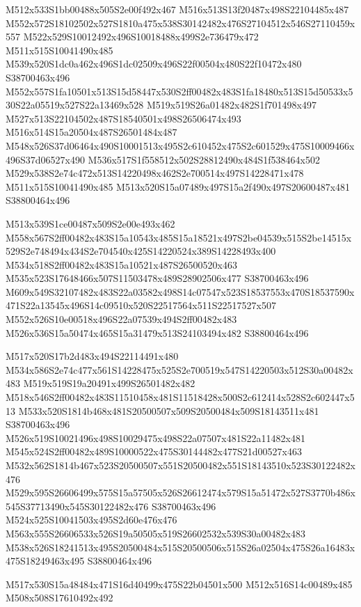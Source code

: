 \documentclass{article}
\begin{document}
\begin{multicols}{2}
M512x533S1bb00488x505S2e00f492x467 M516x513S13f20487x498S22104485x487 M552x572S18102502x527S1810a475x538S30142482x476S27104512x546S27110459x557 M522x529S10012492x496S10018488x499S2e736479x472 M511x515S10041490x485 M539x520S1dc0a462x496S1dc02509x496S22f00504x480S22f10472x480 S38700463x496 M552x557S1fa10501x513S15d58447x530S2ff00482x483S1fa18480x513S15d50533x530S22a05519x527S22a13469x528 M519x519S26a01482x482S1f701498x497 M527x513S22104502x487S18540501x498S26506474x493 M516x514S15a20504x487S26501484x487 M548x526S37d06464x490S10001513x495S2c610452x475S2c601529x475S10009466x496S37d06527x490 M536x517S1f558512x502S28812490x484S1f538464x502 M529x538S2e74c472x513S14220498x462S2e700514x497S14228471x478 M511x515S10041490x485 M513x520S15a07489x497S15a2f490x497S20600487x481 S38800464x496

M513x539S1ce00487x509S2e00e493x462 M558x567S2ff00482x483S15a10543x485S15a18521x497S2be04539x515S2be14515x529S2e748494x434S2e704540x425S14220524x389S14228493x400 M534x518S2ff00482x483S15a10521x487S26500520x463 M535x523S17648466x507S11503478x489S28902506x477 S38700463x496 M609x549S32107482x483S22a03582x498S14c07547x523S18537553x470S18537590x471S22a13545x496S14c09510x520S22517564x511S22517527x507 M552x526S10e00518x496S22a07539x494S2ff00482x483 M526x536S15a50474x465S15a31479x513S24103494x482 S38800464x496

M517x520S17b2d483x494S22114491x480 M534x586S2e74c477x561S14228475x525S2e700519x547S14220503x512S30a00482x483 M519x519S19a20491x499S26501482x482 M518x546S2ff00482x483S11510458x481S11518428x500S2c612414x528S2c602447x513 M533x520S1814b468x481S20500507x509S20500484x509S18143511x481 S38700463x496 M526x519S10021496x498S10029475x498S22a07507x481S22a11482x481 M545x524S2ff00482x489S10000522x475S30144482x477S21d00527x463 M532x562S1814b467x523S20500507x551S20500482x551S18143510x523S30122482x476 M529x595S26606499x575S15a57505x526S26612474x579S15a51472x527S3770b486x545S37713490x545S30122482x476 S38700463x496 M524x525S10041503x495S2d60e476x476 M563x555S26606533x526S19a50505x519S26602532x539S30a00482x483 M538x526S18241513x495S20500484x515S20500506x515S26a02504x475S26a16483x475S18249463x495 S38800464x496

\begin{center}
M517x530S15a48484x471S16d40499x475S22b04501x500 M512x516S14c00489x485 M508x508S17610492x492 
\end{center}



\end{multicols}
\end{document}
